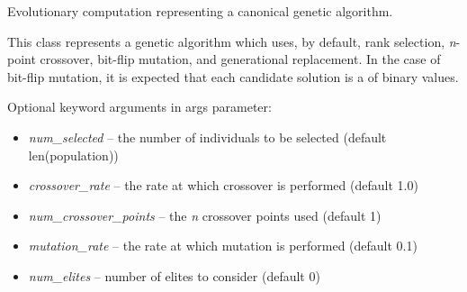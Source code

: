 \documentclass[letterpaper,10pt,english]{sphinxmanual}
\begin{document}
\begin{fulllineitems}
\label{reference:inspyred.ec.GA}
Evolutionary computation representing a canonical genetic algorithm.

This class represents a genetic algorithm which uses, by 
default, rank selection, \emph{n}-point crossover, bit-flip mutation, 
and generational replacement. In the case of bit-flip mutation, 
it is expected that each candidate solution is a  
of binary values.

Optional keyword arguments in  args parameter:
\begin{itemize}
\item {} 
\emph{num\_selected} -- the number of individuals to be selected 
(default len(population))

\item {} 
\emph{crossover\_rate} -- the rate at which crossover is performed 
(default 1.0)

\item {} 
\emph{num\_crossover\_points} -- the \emph{n} crossover points used (default 1)

\item {} 
\emph{mutation\_rate} -- the rate at which mutation is performed (default 0.1)

\item {} 
\emph{num\_elites} -- number of elites to consider (default 0)

\end{itemize}

\end{fulllineitems}

\end{document}
